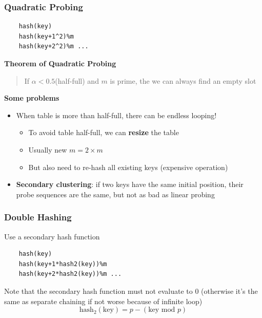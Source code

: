 \documentclass{article}
\begin{document}
\begin{multicols}{2}
\subsubsection{Quadratic Probing}
\begin{lstlisting}
	hash(key)
	hash(key+1^2)%m
	hash(key+2^2)%m ...
\end{lstlisting}
\textbf{Theorem of Quadratic Probing}
\begin{quote}
If $\alpha < 0.5$(half-full) and $m$ is prime, the we can always find an empty slot
\end{quote}
\textbf{Some problems}
\begin{itemize}
	\item When table is more than half-full, there can be endless looping!
	\begin{itemize}
		\item To avoid table half-full, we can \textbf{resize} the table
		\item Usually new $m = 2\times m$
		\item But also need to re-hash all existing keys (expensive operation)
	\end{itemize}
	\item \textbf{Secondary clustering}: if two keys have the same initial position, their probe sequences are the same, but not as bad as linear probing
\end{itemize}

\subsubsection{Double Hashing}
Use a secondary hash function
\begin{lstlisting}
	hash(key)
	hash(key+1*hash2(key))%m
	hash(key+2*hash2(key))%m ...
\end{lstlisting}
Note that the secondary hash function must not evaluate to 0 (otherwise it's the same as separate chaining if not worse because of infinite loop)
$$\text{hash}_2(\text{key}) = p - (\text{key} \text{ mod } p)$$


\end{multicols}
\end{document}
